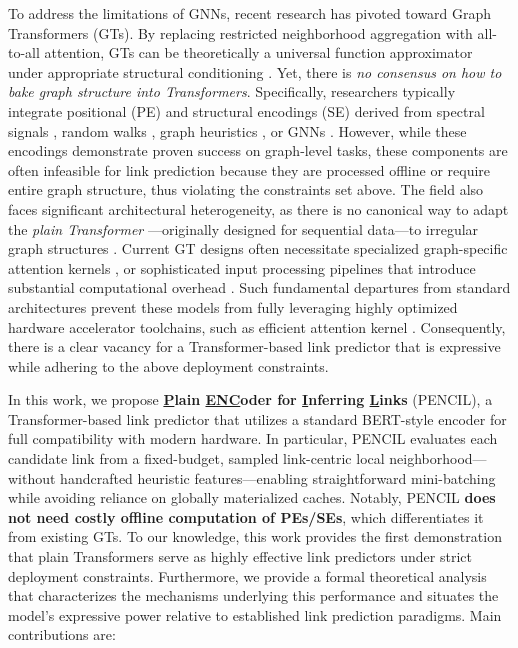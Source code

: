 \documentclass{article}
\theoremstyle{plain}
\theoremstyle{definition}
\theoremstyle{remark}
\begin{document}
To address the limitations of GNNs, recent research has pivoted toward Graph Transformers (GTs). By replacing restricted neighborhood aggregation with all-to-all attention, GTs can be theoretically a universal function approximator under appropriate structural conditioning \cite{muller_attending_2024}. Yet, there is \textit{no consensus on how to bake graph structure into Transformers}. Specifically, researchers typically integrate positional (PE) and structural encodings (SE) derived from spectral signals \cite{rampasek2022GPS, kreuzer2021rethinking, dwivedi2021generalization}, random walks \cite{chen2025learning, kim_revisiting_2025}, graph heuristics \cite{ying_do_transformers_2021}, or GNNs \cite{jain2021representing, dwivedi2025relationalgraphtransformer}. However, while these encodings demonstrate proven success on graph-level tasks, these components are often infeasible for link prediction because they are processed offline or require entire graph structure, thus violating the constraints set above. The field also faces significant architectural heterogeneity, as there is no canonical way to adapt the \textit{plain Transformer} \cite{vaswani2017attention}---originally designed for sequential data---to irregular graph structures \cite{ma_plain_2025}. Current GT designs often necessitate specialized graph-specific attention kernels \cite{ma_graph_2023, shomer_lpformer_2024}, or sophisticated input processing pipelines that introduce substantial computational overhead \cite{chen2022structure, zhao_graphgpt_2025}. Such fundamental departures from standard architectures prevent these models from fully leveraging highly optimized hardware accelerator toolchains, such as efficient attention kernel \cite{dao2022flashattention}. Consequently, there is a clear vacancy for a Transformer-based link predictor that is expressive while adhering to the above deployment constraints.

In this work, we propose \textbf{\underline{P}lain \underline{ENC}oder for \underline{I}nferring \underline{L}inks} (PENCIL), a Transformer-based link predictor that utilizes a standard BERT-style encoder \cite{devlin-etal-2019-bert} for full compatibility with modern hardware. In particular, PENCIL evaluates each candidate link from a fixed-budget, sampled link-centric local neighborhood---without handcrafted heuristic features---enabling straightforward mini-batching while avoiding reliance on globally materialized caches. Notably, PENCIL \textbf{does not need costly offline computation of PEs/SEs}, which differentiates it from existing GTs. To our knowledge, this work provides the first demonstration that plain Transformers serve as highly effective link predictors under strict deployment constraints. Furthermore, we provide a formal theoretical analysis that characterizes the mechanisms underlying this performance and situates the model's expressive power relative to established link prediction paradigms. Main contributions are: 
\end{document}
